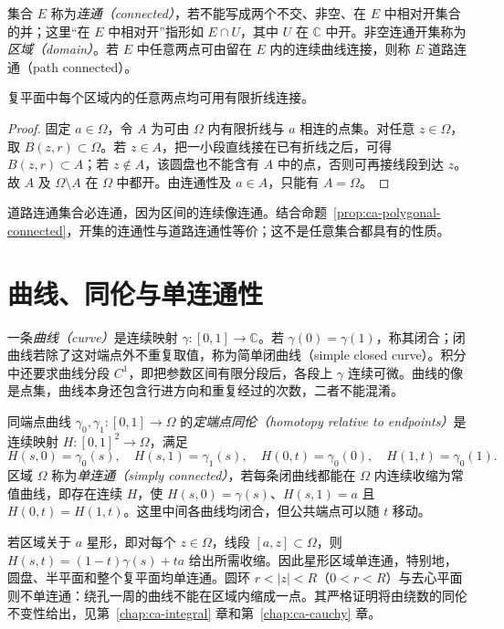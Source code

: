 \begin{definition}[连通与区域]
集合 $E$ 称为\emph{连通（connected）}，若不能写成两个不交、非空、在 $E$ 中相对开集合的并；这里“在 $E$ 中相对开”指形如 $E\cap U$，其中 $U$ 在 $\mathbb{C}$ 中开。非空连通开集称为\emph{区域（domain）}。若 $E$ 中任意两点可由留在 $E$ 内的连续曲线连接，则称 $E$ 道路连通（path connected）。
\end{definition}

\begin{proposition}
\label{prop:ca-polygonal-connected}
复平面中每个区域内的任意两点均可用有限折线连接。
\end{proposition}
\begin{proof}
固定 $a\in\Omega$，令 $A$ 为可由 $\Omega$ 内有限折线与 $a$ 相连的点集。对任意 $z\in\Omega$，取 $B(z,r)\subset\Omega$。若 $z\in A$，把一小段直线接在已有折线之后，可得 $B(z,r)\subset A$；若 $z\notin A$，该圆盘也不能含有 $A$ 中的点，否则可再接线段到达 $z$。故 $A$ 及 $\Omega\setminus A$ 在 $\Omega$ 中都开。由连通性及 $a\in A$，只能有 $A=\Omega$。
\end{proof}

道路连通集合必连通，因为区间的连续像连通。结合命题~\ref{prop:ca-polygonal-connected}，开集的连通性与道路连通性等价；这不是任意集合都具有的性质。

\section{曲线、同伦与单连通性}

一条\emph{曲线（curve）}是连续映射 $\gamma:[0,1]\to\mathbb{C}$。若 $\gamma(0)=\gamma(1)$，称其闭合；闭曲线若除了这对端点外不重复取值，称为简单闭曲线（simple closed curve）。积分中还要求曲线分段 $C^1$，即把参数区间有限分段后，各段上 $\gamma$ 连续可微。曲线的像是点集，曲线本身还包含行进方向和重复经过的次数，二者不能混淆。

\begin{definition}[同伦与单连通]
同端点曲线 $\gamma_0,\gamma_1:[0,1]\to\Omega$ 的\emph{定端点同伦（homotopy relative to endpoints）}是连续映射 $H:[0,1]^2\to\Omega$，满足
\[
 H(s,0)=\gamma_0(s),\quad H(s,1)=\gamma_1(s),\quad
 H(0,t)=\gamma_0(0),\quad H(1,t)=\gamma_0(1).
\]
区域 $\Omega$ 称为\emph{单连通（simply connected）}，若每条闭曲线都能在 $\Omega$ 内连续收缩为常值曲线，即存在连续 $H$，使 $H(s,0)=\gamma(s)$、$H(s,1)=a$ 且 $H(0,t)=H(1,t)$。这里中间各曲线均闭合，但公共端点可以随 $t$ 移动。
\end{definition}

若区域关于 $a$ 星形，即对每个 $z\in\Omega$，线段 $[a,z]\subset\Omega$，则 $H(s,t)=(1-t)\gamma(s)+ta$ 给出所需收缩。因此星形区域单连通，特别地，圆盘、半平面和整个复平面均单连通。圆环 $r<|z|<R$（$0<r<R$）与去心平面则不单连通：绕孔一周的曲线不能在区域内缩成一点。其严格证明将由绕数的同伦不变性给出，见第~\ref{chap:ca-integral} 章和第~\ref{chap:ca-cauchy} 章。

